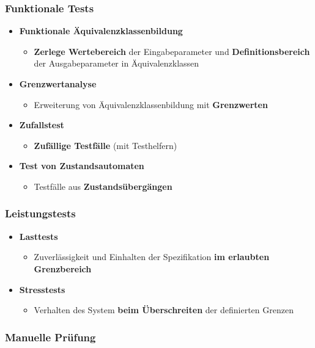 \subsubsection{Funktionale Tests}
	
\begin{itemize}
\item \textbf{Funktionale Äquivalenzklassenbildung}
\begin{itemize}
\item \textbf{Zerlege Wertebereich} der Eingabeparameter und \textbf{Definitionsbereich} der Ausgabeparameter in Äquivalenzklassen
\end{itemize}
\item \textbf{Grenzwertanalyse}
\begin{itemize}
\item Erweiterung von Äquivalenzklassenbildung mit \textbf{Grenzwerten}
\end{itemize}
\item \textbf{Zufallstest}
\begin{itemize}
\item \textbf{Zufällige Testfälle} (mit Testhelfern)
\end{itemize}
\item \textbf{Test von Zustandsautomaten}
\begin{itemize}
\item Testfälle aus \textbf{Zustandsübergängen}
\end{itemize}
\end{itemize}
	
\subsubsection{Leistungstests}
		
\begin{itemize}
\item \textbf{Lasttests}
\begin{itemize}
\item Zuverlässigkeit und Einhalten der Spezifikation \textbf{im erlaubten Grenzbereich}
\end{itemize}
\item \textbf{Stresstests}
\begin{itemize}
\item Verhalten des System \textbf{beim Überschreiten} der definierten Grenzen
\end{itemize}
\end{itemize}
	
\subsubsection{Manuelle Prüfung}
	
